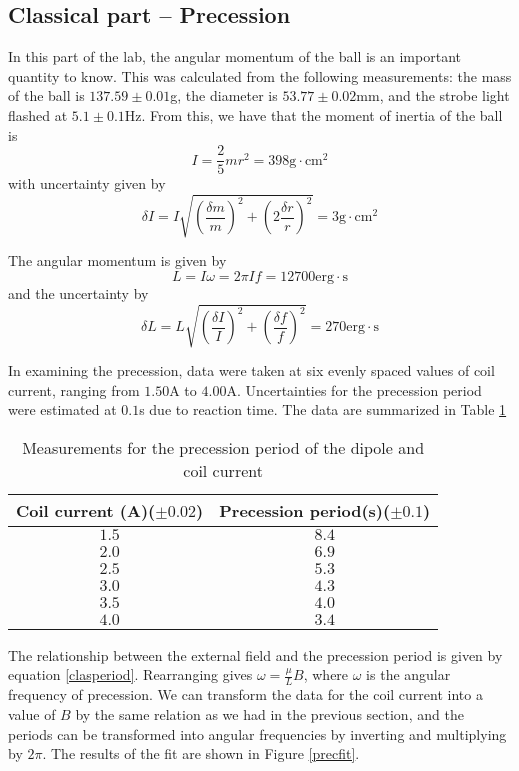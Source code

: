 \documentclass{amsart}
\numberwithin{equation}{section}
\begin{document}
\subsection{Classical part -- Precession}
In this part of the lab, the angular momentum of the ball is an important quantity to know. This was calculated from the following measurements: the mass of the ball is $137.59\pm0.01$g, the diameter is $53.77\pm0.02$mm, and the strobe light flashed at $5.1\pm0.1$Hz. From this, we have that the moment of inertia of the ball is 
\begin{equation*}
I=\frac{2}{5}mr^2=398\text{g}\cdot\text{cm}^2
\end{equation*}
with uncertainty given by 
\begin{equation*}
\delta I=I\sqrt{\left(\frac{\delta m}{m}\right)^2+\left(2\frac{\delta r}{r}\right)^2}=3\text{g}\cdot\text{cm}^2
\end{equation*}

The angular momentum is given by 
\begin{equation*}
L=I\omega=2\pi If=12700\text{erg}{\cdot}\text{s}
\end{equation*}
and the uncertainty by $$\delta L=L\sqrt{\left(\frac{\delta I}{I}\right)^2+\left(\frac{\delta f}{f}\right)^2}=270\text{erg}{\cdot}\text{s}$$

In examining the precession, data were taken at six evenly spaced values of coil current, ranging from $1.50$A to $4.00$A. Uncertainties for the precession period were estimated at $0.1$s due to reaction time. The data are summarized in Table \ref{precdat}

\begin{table}
\begin{tabular}[t]{|c|c|}
\hline
Coil current (A)($\pm0.02$) & Precession period(s)($\pm0.1$)\\
\hline
$1.5$ & $8.4$\\
$2.0$ & $6.9$\\
$2.5$ & $5.3$\\
$3.0$ & $4.3$\\
$3.5$ & $4.0$\\
$4.0$ & $3.4$\\
\hline
\end{tabular}
\caption{Measurements for the precession period of the dipole and coil current}
\label{precdat}
\end{table}

The relationship between the external field and the precession period is given by equation \ref{clasperiod}. Rearranging gives $\omega=\frac{\mu}{L}B$, where $\omega$ is the angular frequency of precession. We can transform the data for the coil current into a value of $B$ by the same relation as we had in the previous section, and the periods can be transformed into angular frequencies by inverting and multiplying by $2\pi$. The results of the fit are shown in Figure \ref{precfit}.
\end{document}
